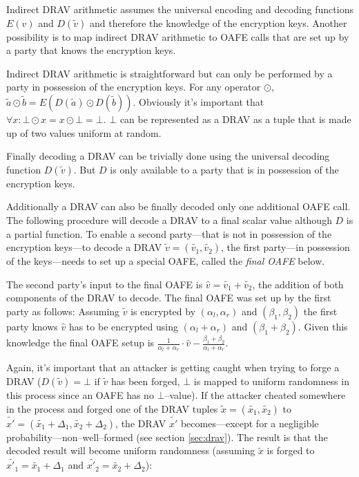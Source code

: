 \label{sec:indirect-DRAV-arithmetic}

Indirect DRAV arithmetic assumes the universal encoding and decoding functions
$E(v)$ and $D(\widetilde{v})$ and therefore the knowledge of the encryption
keys. Another possibility is to map indirect DRAV arithmetic to OAFE calls that
are set up by a party that knows the encryption keys.

Indirect DRAV arithmetic is straightforward but can only be performed by a party
in possession of the encryption keys. For any operator $\odot$, $\widetilde{a}
\odot \widetilde{b} = E(D(\widetilde{a}) \odot D(\widetilde{b}))$. Obviously
it's important that $\forall x: \bot \odot x = x \odot \bot = \bot$. $\bot$ can
be represented as a DRAV as a tuple that is made up of two values uniform at
random.


\label{sec:drav-final-decoding}

Finally decoding a DRAV can be trivially done using the universal decoding
function $D(\widetilde{v})$. But $D$ is only available to a party that is in
possession of the encryption keys.

Additionally a DRAV can also be finally decoded only one additional OAFE call.
The following procedure will decode a DRAV to a final scalar value although
$D$ is a partial function. To enable a second party---that is not in possession
of the encryption keys---to decode a DRAV $\widetilde{v} = (\widetilde{v_1},
\widetilde{v_2})$, the first party---in possession of the keys---needs to set up
a special OAFE, called the \emph{final OAFE} below.

The second party's input to the final OAFE is $\widehat{v} = \widetilde{v_1} +
\widetilde{v_2}$, the addition of both components of the DRAV to decode.  The
final OAFE was set up by the first party as follows: Assuming $\widetilde{v}$ is
encrypted by $(\alpha_l, \alpha_r)$ and $(\beta_1, \beta_2)$ the first party
knows $\widehat{v}$ has to be encrypted using $(\alpha_l + \alpha_r)$ and
$(\beta_1 + \beta_2)$.  Given this knowledge the final OAFE setup is
$\frac{1}{\alpha_l + \alpha_r} \cdot \widehat{v} - \frac{\beta_1 +
\beta_2}{\alpha_l + \alpha_r}$.

Again, it's important that an attacker is getting caught when trying to forge a
DRAV ($D(\widetilde{v}) = \bot$ if $\widetilde{v}$ has been forged, $\bot$ is
mapped to uniform randomness in this process since an OAFE has no
$\bot$--value). If the attacker cheated somewhere in the process and forged one
of the DRAV tuples $\widetilde{x} = (\widetilde{x_1}, \widetilde{x_2})$ to
$\widetilde{x'} = (\widetilde{x_1} + \Delta_1, \widetilde{x_2} + \Delta_2)$, the
DRAV $\widetilde{x'}$ becomes---except for a negligible
probability---non--well--formed (see section \ref{sec:drav}). The result is that
the decoded result will become uniform randomness (assuming $\widetilde{x}$ is
forged to $\widetilde{x'_1} = \widetilde{x_1} + \Delta_1$ and $\widetilde{x'_2}
= \widetilde{x_2} + \Delta_2$):

